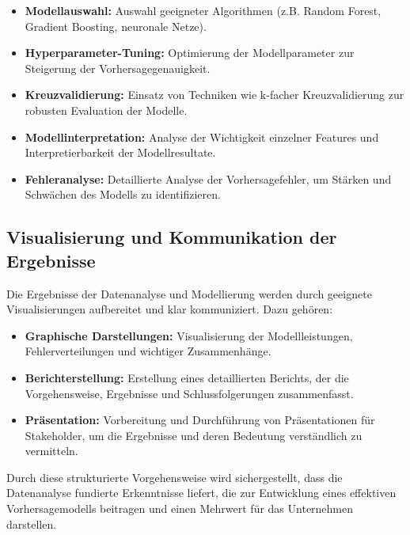 \documentclass[%
pdftex,
oneside,			%
11pt,				%
parskip=half,		%
headheight = 12pt,	%
headsepline,		%
footsepline,		%
footheight = 16pt,	%
abstracton,		%
DIV=calc,		%
BCOR=8mm,		%
headinclude=false,	%
footinclude=false,	%
listof=totoc,		%
toc=bibliography,	%
]{scrreprt}	%
\begin{document}
            \begin{itemize}
                \item \textbf{Modellauswahl:} Auswahl geeigneter Algorithmen (z.B. Random Forest, Gradient Boosting, neuronale Netze).
                \item \textbf{Hyperparameter-Tuning:} Optimierung der Modellparameter zur Steigerung der Vorhersagegenauigkeit.
                \item \textbf{Kreuzvalidierung:} Einsatz von Techniken wie k-facher Kreuzvalidierung zur robusten Evaluation der Modelle.
                \item \textbf{Modellinterpretation:} Analyse der Wichtigkeit einzelner Features und Interpretierbarkeit der Modellresultate.
                \item \textbf{Fehleranalyse:} Detaillierte Analyse der Vorhersagefehler, um Stärken und Schwächen des Modells zu identifizieren.
            \end{itemize}
        
        \subsection{Visualisierung und Kommunikation der Ergebnisse}
            
            Die Ergebnisse der Datenanalyse und Modellierung werden durch geeignete Visualisierungen aufbereitet und klar kommuniziert. Dazu gehören:
            
            \begin{itemize}
                \item \textbf{Graphische Darstellungen:} Visualisierung der Modellleistungen, Fehlerverteilungen und wichtiger Zusammenhänge.
                \item \textbf{Berichterstellung:} Erstellung eines detaillierten Berichts, der die Vorgehensweise, Ergebnisse und Schlussfolgerungen zusammenfasst.
                \item \textbf{Präsentation:} Vorbereitung und Durchführung von Präsentationen für Stakeholder, um die Ergebnisse und deren Bedeutung verständlich zu vermitteln.
            \end{itemize}
            
            Durch diese strukturierte Vorgehensweise wird sichergestellt, dass die Datenanalyse fundierte Erkenntnisse liefert, die zur Entwicklung eines effektiven Vorhersagemodells beitragen und einen Mehrwert für das Unternehmen darstellen.
            
\end{document}
